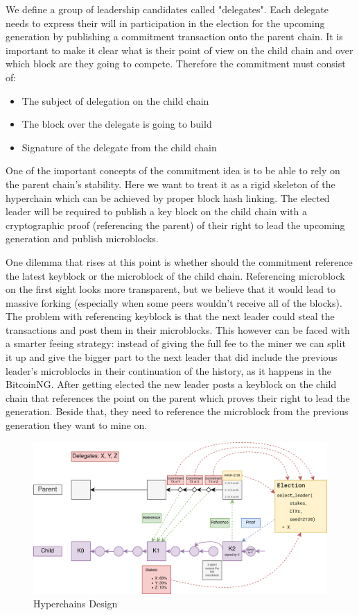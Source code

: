 We define a group of leadership candidates called "delegates". Each delegate
needs to express their will in participation in the election for the upcoming
generation by publishing a commitment transaction onto the parent chain. It is
important to make it clear what is their point of view on the child chain and
over which block are they going to compete.
Therefore the commitment must consist of:
\begin{itemize}
\item The subject of delegation on the child chain
\item The block over the delegate is going to build
\item Signature of the delegate from the child chain
\end{itemize}

One of the important concepts of the commitment idea is to be able to rely on
the parent chain's stability. Here we want to treat it as a rigid skeleton
of the hyperchain which can be achieved by proper block hash linking. The
elected leader will be required to publish a key block on the child chain with a
cryptographic proof (referencing the parent) of their right to lead the
upcoming generation and publish microblocks.

One dilemma that rises at this point is whether should the commitment reference
the latest keyblock or the microblock of the child chain. Referencing microblock
on the first sight looks more transparent, but we believe that it would
lead to massive forking (especially when some peers wouldn't receive all of the
blocks). The problem with referencing keyblock is that the next leader could
steal the transactions and post them in their microblocks. This however can be
faced with a smarter feeing strategy: instead of giving the full fee to the
miner we can split it up and give the bigger part to the next leader that did
include the previous leader's microblocks in their continuation of the history,
as it happens in the BitcoinNG\cite{incentive_bcng}.
After getting elected the new leader posts a keyblock on the child chain that
references the point on the parent which proves their right to lead the
generation. Beside that, they need to reference the microblock from the previous
generation they want to mine on.


\begin{figure}[h]
	\caption{Hyperchains Design}
	\centering
	\includegraphics[scale=0.3]{hyperchains_design}
\end{figure}

